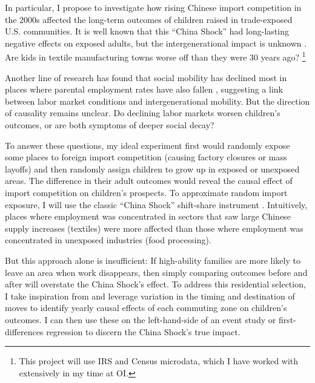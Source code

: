 \documentclass{grad-statement}
\begin{document}
In particular, I propose to investigate how rising Chinese import competition in the 2000s affected the long-term outcomes of children raised in trade-exposed U.S. communities.
It is well known that this ``China Shock'' had long-lasting negative effects on exposed adults, but the intergenerational impact is unknown \parencite{autor-etal-2025-places-people}.
Are kids in textile manufacturing towns worse off than they were 30 years ago?%
\footnote{
	This project will use IRS and Census microdata, which I have worked with extensively in my time at OI.
}

Another line of research has found that social mobility has declined most in places where parental employment rates have also fallen \parencite{chetty-etal-2024-race-trends}, suggesting a link between labor market conditions and intergenerational mobility.
But the direction of causality remains unclear.
Do declining labor markets worsen children's outcomes, or are both symptoms of deeper social decay?

To answer these questions, my ideal experiment first would randomly expose some places to foreign import competition (causing factory closures or mass layoffs) and then randomly assign children to grow up in exposed or unexposed areas.
The difference in their adult outcomes would reveal the causal effect of import competition on children's prospects.
%
To approximate random import exposure, I will use the classic ``China Shock'' shift-share instrument \parencite[for example]{autor-etal-2025-places-people}.
Intuitively, places where employment was concentrated in sectors that saw large Chinese supply increases (textiles) were more affected than those where employment was concentrated in unexposed industries (food processing).

But this approach alone is insufficient: If high-ability families are more likely to leave an area when work disappears, then simply comparing outcomes before and after will overstate the China Shock's effect.
%
To address this residential selection, I take inspiration from \textcite{chetty-etal-2024-race-trends} and leverage variation in the timing and destination of moves to identify yearly causal effects of each commuting zone on children's outcomes.
I can then use these on the left-hand-side of an event study or first-differences regression to discern the China Shock's true impact.
\end{document}
